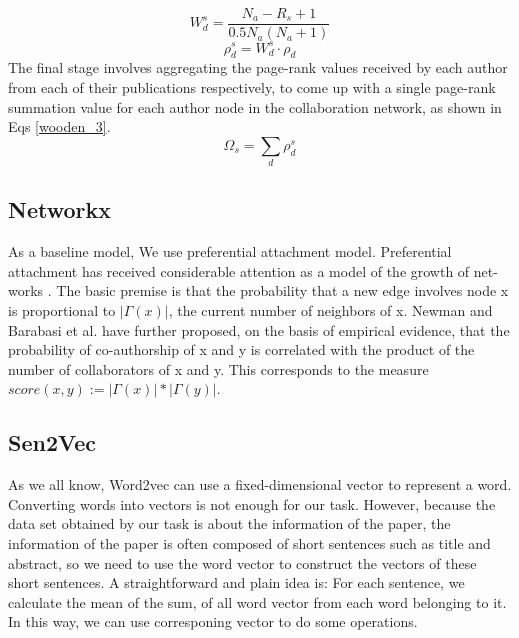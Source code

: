 \documentclass[conference]{IEEEtran}
\begin{document}
\begin{equation}
W_d^s = \frac{N_a-R_s +1}{0.5N_a(N_a+1)}
\label{wooden_1}
\end{equation}
\begin{equation}
	\rho_d^s = W_d^s \cdot \rho_d
\label{wooden_2}
\end{equation}
The final stage involves aggregating the page-rank values received by each author from each of their publications respectively, to come up with a single page-rank summation value for each author node in the collaboration network, as shown in Eqs \ref{wooden_3}.
\begin{equation}
\Omega_s =\sum_d \rho_d^s 
\label{wooden_3}
\end{equation}
\subsection{Networkx}
As a baseline model, We use preferential attachment model. Preferential attachment has received considerable attention as a model of the growth of net-works \cite{mitzenmacher2004brief}. The basic premise is that the probability that a new edge involves node x is proportional to $|\Gamma(x)|$, the current number of neighbors of x. Newman \cite{newman2001clustering} and Barabasi et al. \cite{barabasi2002evolution} have further proposed, on the basis of empirical evidence, that the probability of co-authorship of x and y is correlated with the product of the number of collaborators of x and y. This corresponds to the measure $score(x, y) := |\Gamma(x)|*|\Gamma(y)|$. 
\subsection{Sen2Vec}
As we all know, Word2vec can use a fixed-dimensional vector to represent a word. Converting words into vectors is not enough for our task.\cite{mikolov2013efficient} However, because the data set obtained by our task is about the information of the paper, the information of the paper is often composed of short sentences such as title and abstract, so we need to use the word vector to construct the vectors of these short sentences. A straightforward and plain idea is: For each sentence, we calculate the mean of the sum, of all word vector from each word belonging to it. In this way, we can use corresponing vector to do some operations.
\end{document}
